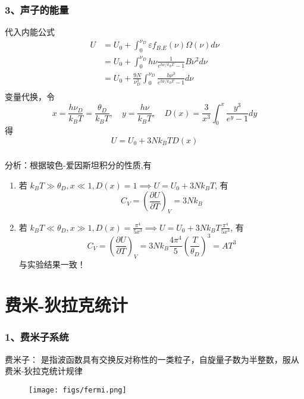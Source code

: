 \begin{frame}[label=current]
  \frametitle{ 3、声子的能量}
  代入内能公式
   \[ 
   \begin{aligned}
    U &= U_0 + \int_{0}^{\nu _D} \varepsilon f_{B.E}(\nu) \Omega (\nu) d \nu   \\ 
      &= U_0 + \int_{0}^{\nu _D} h \nu  \frac{1}{e^{h \nu /k_B T}-1} B \nu^2  d \nu \\
      &= U_0 + \frac{9N}{\nu _D^3} \int_{0}^{\nu _D} \frac{h\nu^3 }{e^{h \nu /k_B T}-1}  d \nu \\
   \end{aligned} 
   \]
   变量代换，令 
   \[ x= \frac{h\nu _D}{k_B T} = \frac{\theta_D}{k_B T}, \quad y= \frac{h\nu}{k_B T}, \quad D(x) = \frac{3}{x^3} \int_{0}^{x}  \frac{y^3}{e^{y}-1} dy\]
   得 
   \[ U= U_0 + 3Nk_B T D(x)\]
\end{frame} 

\begin{frame}[label=current]
  \frametitle{}
分析：根据玻色-爱因斯坦积分的性质,有 
\begin{enumerate}
  \item 若 $k_B T\gg \theta_D, x \ll 1, D(x)=1 \implies U= U_0 + 3Nk_B T$, 有 \[ C_V = \left(\frac{\partial U}{\partial T }\right)_V = 3N k_B \]
  \item 若 $k_B T\ll \theta_D, x \gg 1, D(x)=\frac{\pi ^4}{5x^3} \implies U= U_0 + 3Nk_B T \frac{\pi ^4}{5x^3}$, 有 \[ C_V = \left(\frac{\partial U}{\partial T }\right)_V = 3N k_B \frac{4\pi ^4}{5} \left(\frac{T}{\theta_D}\right)^3 = A T^3\] 
  与实验结果一致！
\end{enumerate}

\end{frame} 

\section{费米-狄拉克统计}

\begin{frame}
  \frametitle{ 1、费米子系统}

  \alert{费米子：} 是指波函数具有交换反对称性的一类粒子，自旋量子数为半整数，服从费米-狄拉克统计规律
   \begin{figure}[htbp]
    \centering
    \texttt{[image: figs/fermi.png]}
   \end{figure}
\end{frame} 

